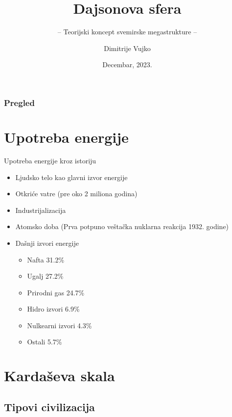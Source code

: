\documentclass[13pt]{beamer}
\title{Dajsonova sfera}
\subtitle{-- Teorijski koncept svemirske megastrukture --}
\author{Dimitrije Vujko}
\institute{Matematički fakultet,\\ Univerzitet u Beogradu}
\date{
	\footnotesize{Decembar, 2023.}	
}
\begin{document}
\maketitle



\begin{frame}
	\frametitle{Pregled} %
	\tableofcontents[hidesubsections] 
\end{frame}



\section{Upotreba energije}

\begin{frame}{Upotreba energije kroz istoriju}

\begin{itemize}
    \item Ljudsko telo kao glavni izvor energije
    \item Otkriće vatre (pre oko 2 miliona godina)
    \item Industrijalizacija
    \item Atomsko doba (Prva potpuno veštačka nuklarna reakcija 1932. godine)
    \item Dašnji izvori energije
    \begin{itemize}
        \item Nafta 31.2\%
        \item Ugalj 27.2\%
        \item Prirodni gas 24.7\%
        \item Hidro izvori 6.9\%
        \item Nulkearni izvori 4.3\%
        \item Ostali 5.7\%
    \end{itemize}
\end{itemize}

\end{frame}



\section{Kardaševa skala}

\subsection{Tipovi civilizacija}
\end{document}
